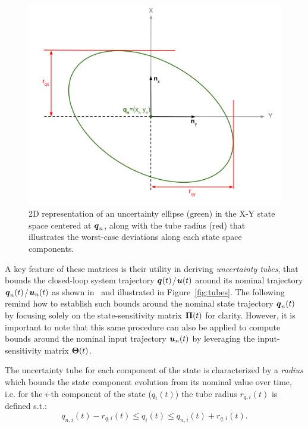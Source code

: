 \begin{figure} [t]
  \centering
  \includegraphics[width=0.8\linewidth]{figures/models/radius.png} 
  \caption{2D representation of an uncertainty ellipse (green) in the X-Y state space centered at $\boldsymbol{q}_n$, along with the tube radius (red) that illustrates the worst-case deviations along each state space components.}%
  \label{fig:ellips_radius}%
\end{figure}

A key feature of these matrices is their utility in deriving \emph{uncertainty tubes}, that bounds the closed-loop system trajectory $\boldsymbol{q}(t)$/$\boldsymbol{u}(t)$ around its nominal trajectory $\boldsymbol{q}_n(t)$/$\boldsymbol{u}_n(t)$ as shown in~\cite{cTube} and illustrated in Figure~\ref{fig:tubes}.
The following remind how to establish such bounds around the nominal state trajectory $\boldsymbol{q}_n(t)$ by focusing solely on the state-sensitivity matrix $\boldsymbol{\Pi}(t)$ for clarity. 
However, it is important to note that this same procedure can also be applied to compute bounds around the nominal input trajectory $\boldsymbol{u}_n(t)$ by leveraging the input-sensitivity matrix $\boldsymbol{\Theta}(t)$.

The uncertainty tube for each component of the state is characterized by a \emph{radius} which bounds the state component evolution from its nominal value over time, i.e. for the $i$-th component of the state ($q_i(t)$) the tube radius $r_{q,i}(t)$ is defined s.t.:
\begin{equation}\label{eq:bounds_q}
  q_{n,i}(t) - r_{q,i}(t) \leq q_i(t) \leq q_{n,i}(t) + r_{q,i}(t).
\end{equation}


